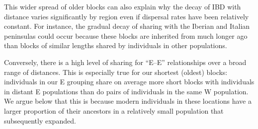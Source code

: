 \documentclass{article}
\begin{document}
This wider spread of older blocks can also explain why the decay of IBD with distance varies
significantly by region even if dispersal rates have been relatively constant.
For instance, the gradual decay of sharing with the Iberian and Italian peninsulas
could occur because these blocks are inherited from much longer ago
than blocks of similar lengths shared by individuals in other populations.

Conversely, there is a high level of sharing for ``E--E'' relationships over a broad range of distances.
This is especially true for our shortest (oldest) blocks:
individuals in our E grouping share on average more short blocks with individuals in distant E populations 
than do pairs of individuals in the same W population.
We argue below that this is because modern individuals in these locations
have a larger proportion of their ancestors 
in a relatively small population that subsequently expanded.
\end{document}
